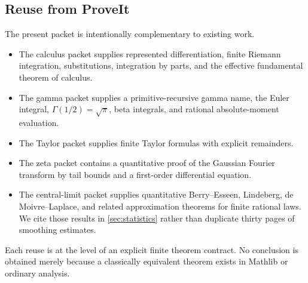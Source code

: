 \subsection{Reuse from ProveIt}

The present packet is intentionally complementary to existing work.
\begin{itemize}
  \item The calculus packet supplies represented differentiation, finite Riemann integration, substitutions, integration by parts, and the effective fundamental theorem of calculus.
  \item The gamma packet supplies a primitive-recursive gamma name, the Euler integral, $\Gamma(1/2)=\sqrt\pi$, beta integrals, and rational absolute-moment evaluation.
  \item The Taylor packet supplies finite Taylor formulas with explicit remainders.
  \item The zeta packet contains a quantitative proof of the Gaussian Fourier transform by tail bounds and a first-order differential equation.
  \item The central-limit packet supplies quantitative Berry--Esseen, Lindeberg, de Moivre--Laplace, and related approximation theorems for finite rational laws.  We cite those results in \cref{sec:statistics} rather than duplicate thirty pages of smoothing estimates.
\end{itemize}
Each reuse is at the level of an explicit finite theorem contract.  No conclusion is obtained merely because a classically equivalent theorem exists in Mathlib or ordinary analysis.
